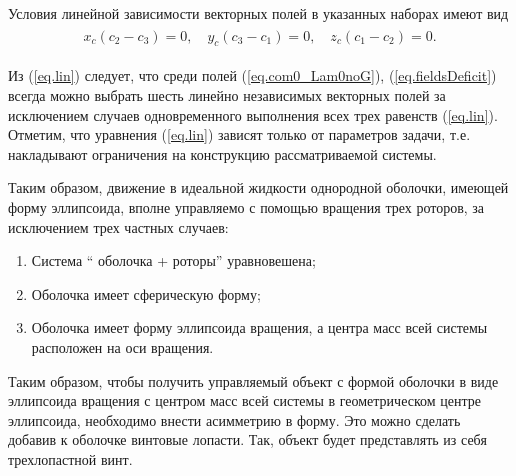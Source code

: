 %

Условия линейной зависимости векторных полей в указанных наборах имеют вид
\begin{gather}
\begin{gathered}
x_c(c_2 - c_3) = 0,\quad
y_c(c_3-c_1) = 0, \quad
z_c(c_1-c_2) = 0.
\end{gathered}\label{eq.lin}
\end{gather}

Из (\ref{eq.lin}) следует, что среди полей (\ref{eq.com0_Lam0noG}), (\ref{eq.fieldsDeficit}) всегда можно выбрать шесть линейно независимых векторных полей за исключением случаев одновременного выполнения всех трех равенств (\ref{eq.lin}). Отметим, что уравнения (\ref{eq.lin}) зависят только от параметров задачи, т.е. накладывают ограничения на конструкцию рассматриваемой системы.

Таким образом, движение в идеальной жидкости однородной оболочки, имеющей форму эллипсоида, вполне управляемо с помощью вращения трех роторов, за исключением трех частных случаев:
\begin{enumerate}
	\item Система “ оболочка + роторы” уравновешена;
	\item Оболочка имеет сферическую форму;
	\item Оболочка имеет форму эллипсоида вращения, а центра масс всей системы	расположен на оси вращения.
\end{enumerate}

Таким образом, чтобы получить управляемый объект с формой оболочки в виде эллипсоида вращения с центром масс всей системы в геометрическом центре эллипсоида, необходимо внести асимметрию в форму. Это можно сделать добавив к оболочке винтовые лопасти. Так, объект будет представлять из себя трехлопастной винт. 

